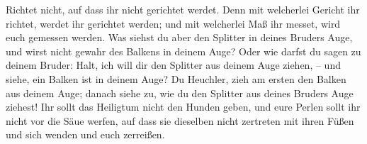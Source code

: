  Richtet nicht, auf dass ihr nicht gerichtet werdet.
 Denn mit welcherlei Gericht ihr richtet, werdet ihr
gerichtet werden; und mit welcherlei Maß ihr messet, wird euch gemessen
werden.  Was siehst du aber den Splitter in deines Bruders
Auge, und wirst nicht gewahr des Balkens in deinem Auge? 
Oder wie darfst du sagen zu deinem Bruder: Halt, ich will dir den
Splitter aus deinem Auge ziehen, -- und siehe, ein Balken ist in deinem
Auge?  Du Heuchler, zieh am ersten den Balken aus deinem
Auge; danach siehe zu, wie du den Splitter aus deines Bruders Auge
ziehest!  Ihr sollt das Heiligtum nicht den Hunden geben,
und eure Perlen sollt ihr nicht vor die Säue werfen, auf dass sie
dieselben nicht zertreten mit ihren Füßen und sich wenden und euch
zerreißen.

